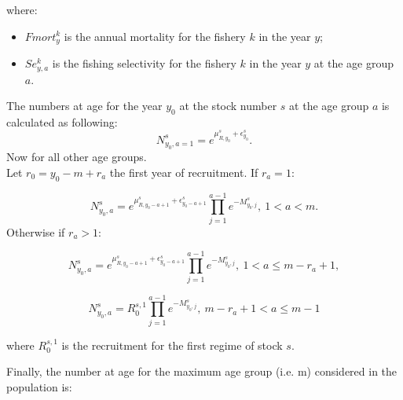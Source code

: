 \documentclass{article}
\begin{document}
where:
\begin{itemize}

    
    \item $Fmort^k_y$ is the annual mortality for the fishery $k$ in the year $y$;
    \item $Se^k_{y,a}$ is the fishing selectivity for the fishery $k$ in the year $y$ at the age group $a$.

\end{itemize}

\hfill

The numbers at age for the year $y_0$ at the stock number $s$ at the age group  $a$ is calculated as following:
\begin{equation}
N^s_{y_0,a=1}=e^{\mu^s_{R,y_0} + \epsilon^s_{y_0}}.
\end{equation}
Now for all other age groups.\\
    Let $r_0 = y_0-m+r_a$ the first year of recruitment. If $r_a=1$:

\begin{equation}
N^s_{y_0,a}=e^{\mu_{R,y_0-a+1}^s + \epsilon^s_{y_0-a+1}}
            \prod_{j=1}^{a-1}e^{-M^s_{y_0,j}}, \ 1<a<m.
\end{equation}
Otherwise if $r_a>1$:

\begin{equation}
N^s_{y_0,a}=e^{\mu_{R,y_0-a+1}^s + \epsilon^s_{y_0-a+1}}                          \prod_{j=1}^{a-1}e^{-M^s_{y_0,j}}, \ 1<a\leq m-r_a+1,
\end{equation}

\begin{equation}
N^s_{y_0,a}=R_0^{s,1}\prod_{j=1}^{a-1}e^{-M^s_{y_0,j}}, \ m-r_a+1<a\leq m-1
\end{equation}

where $R_0^{s,1}$ is the recruitment for the first regime of stock $s$.

Finally, the number at age for the maximum age group (i.e. m) considered in the population is:
\end{document}
